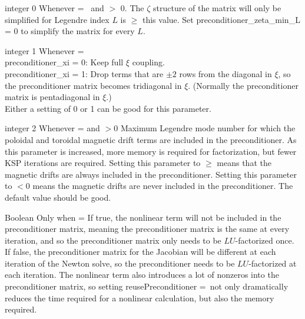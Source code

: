 \myhrule

{integer}
{0}
{Whenever  = \true~and  $>$ 0.}
{The $\zeta$ structure of the matrix will only be simplified for Legendre index $L$ is $\ge$ this value.
Set {\ttfamily preconditioner\_zeta\_min\_L} = 0 to simplify the matrix for every $L$.
}

\myhrule

{integer}
{1}
{Whenever  = \true}
{\\
{\ttfamily preconditioner\_xi} = 0: Keep full $\xi$ coupling.\\

{\ttfamily preconditioner\_xi} = 1: Drop terms that are $\pm 2$ rows from the diagonal in $\xi$, 
      so the preconditioner matrix becomes tridiagonal in $\xi$.
(Normally the preconditioner matrix is pentadiagonal in $\xi$.)\\

Either a setting of 0 or 1 can be good for this parameter.}

\myhrule

{integer}
{2}
{Whenever  = \true and $>0$}
{Maximum Legendre mode number for which the poloidal and toroidal magnetic drift terms are included in the preconditioner.
As this parameter is increased, more memory is required for factorization, but fewer KSP iterations are required.
Setting this parameter to $\ge$  means that the magnetic drifts are always included in the preconditioner.
Setting this parameter to $<0$ means the magnetic drifts are never included in the preconditioner.
The default value should be good.}

\myhrule

{Boolean}
{\true}
{Only when  = \true}
{If true, the nonlinear term will not be included in the preconditioner matrix, meaning the preconditioner matrix is the same
at every iteration, and so the preconditioner matrix only needs to be $LU$-factorized once.  If false, the preconditioner matrix
for the Jacobian will be different at each iteration of the Newton solve, so the preconditioner needs to be $LU$-factorized at
each iteration.  The nonlinear term also introduces a lot of nonzeros into the preconditioner matrix, so setting
{\ttfamily reusePreconditioner =}\true~not only dramatically reduces the time required for a nonlinear calculation, but also the memory required.}










